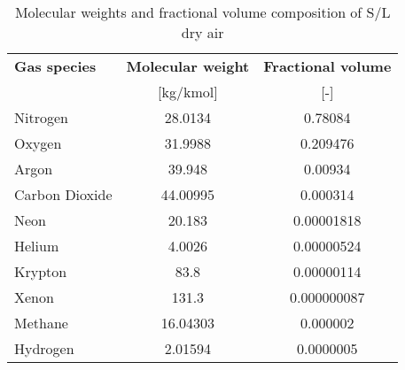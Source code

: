 \begin{table}[h!]
  \begin{center}
    \begin{tabular}{ l | S | S }
      \toprule
      \textbf{Gas species} & \textbf{Molecular weight} & \textbf{Fractional volume} \\
      {} & {[kg/kmol]} & {[-]} \\ \midrule
      Nitrogen       & 28.0134  & 0.78084     \\
      Oxygen         & 31.9988  & 0.209476    \\
      Argon          & 39.948   & 0.00934     \\
      Carbon Dioxide & 44.00995 & 0.000314    \\
      Neon           & 20.183   & 0.00001818  \\
      Helium         & 4.0026   & 0.00000524  \\
      Krypton        & 83.8     & 0.00000114  \\
      Xenon          & 131.3    & 0.000000087 \\
      Methane        & 16.04303 & 0.000002    \\
      Hydrogen       & 2.01594  & 0.0000005   \\
      \bottomrule
    \end{tabular}
    \caption{Molecular weights and fractional volume composition of S/L dry air \cite{NASA-TM-X-74335} }
  \end{center}
\end{table}

\vfill
